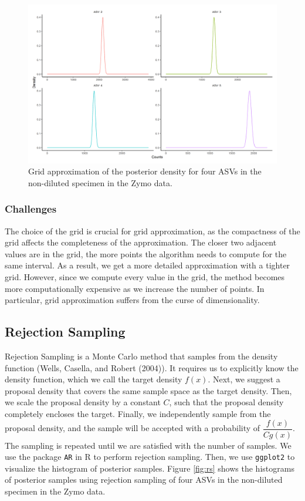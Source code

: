 \documentclass[12pt]{article}
\begin{document}
\begin{figure}[H]
	\centering
	\includegraphics[width=\textwidth]{ga_sample.png}
	\caption{Grid approximation of the posterior density for four ASVs in the non-diluted specimen in the Zymo data.}
	\label{fig:ga}     
\end{figure}

\subsubsection{Challenges}

The choice of the grid is crucial for grid approximation, as the compactness of the grid affects the completeness of the approximation. The closer two adjacent values are in the grid, the more points the algorithm needs to compute for the same interval. As a result, we get a more detailed approximation with a tighter grid. However, since we compute every value in the grid, the method becomes more computationally expensive as we increase the number of points. In particular, grid approximation suffers from the curse of dimensionality. 

\subsection{Rejection Sampling}

Rejection Sampling is a Monte Carlo method that samples from the density function (Wells, Casella, and Robert (2004)). It requires us to explicitly know the density function, which we call the target density $f(x)$. Next, we suggest a proposal density that covers the same sample space as the target density. Then, we scale the proposal density by a constant $C$, such that the proposal density completely encloses the target. Finally, we independently sample from the proposal density, and the sample will be accepted with a probability of $\dfrac{f\left(x\right) }{Cg\left(x\right)}$. The sampling is repeated until we are satisfied with the number of samples. We use the package \texttt{AR} in R to perform rejection sampling. Then, we use \texttt{ggplot2} to visualize the histogram of posterior samples. Figure \ref{fig:rs} shows the histograms of posterior samples using rejection sampling of four ASVs in the non-diluted specimen in the Zymo data.
\end{document}
